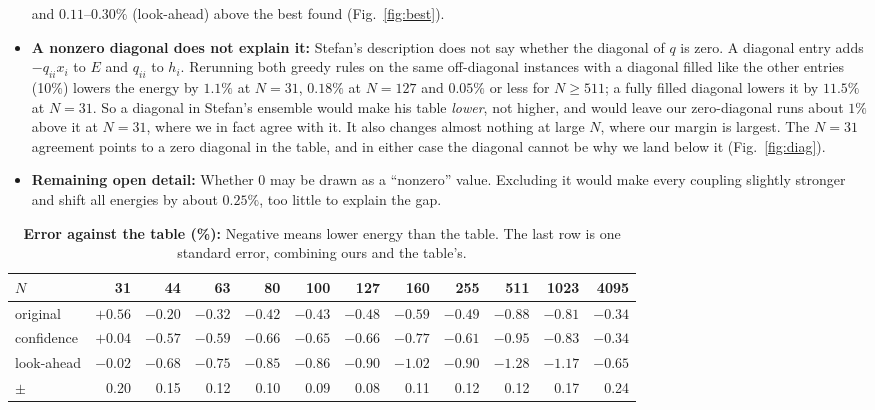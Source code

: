 \documentclass[11pt]{article}
\begin{document}
\begin{itemize}[nosep]
  and $0.11$--$0.30\%$ (look-ahead) above the best found (Fig.~\ref{fig:best}).
  \item \textbf{A nonzero diagonal does not explain it:} Stefan's description does not say whether the diagonal of $q$
  is zero. A diagonal entry adds $-q_{ii}x_i$ to $E$ and $q_{ii}$ to $h_i$. Rerunning both greedy rules on the same
  off-diagonal instances with a diagonal filled like the other entries (10\%) lowers the energy by $1.1\%$ at $N=31$,
  $0.18\%$ at $N=127$ and $0.05\%$ or less for $N \ge 511$; a fully filled diagonal lowers it by $11.5\%$ at $N=31$.
  So a diagonal in Stefan's ensemble would make his table \emph{lower}, not higher, and would leave our zero-diagonal
  runs about $1\%$ above it at $N=31$, where we in fact agree with it. It also changes almost nothing at large $N$,
  where our margin is largest. The $N=31$ agreement points to a zero diagonal in the table, and in either case the
  diagonal cannot be why we land below it (Fig.~\ref{fig:diag}).
  \item \textbf{Remaining open detail:} Whether $0$ may be drawn as a ``nonzero'' value. Excluding it would make
  every coupling slightly stronger and shift all energies by about $0.25\%$, too little to explain the gap.
\end{itemize}

\begin{table}[H]
  \centering\small\setlength{\tabcolsep}{4pt}
  \begin{tabular}{lrrrrrrrrrrr}
    \toprule
    $N$ & 31 & 44 & 63 & 80 & 100 & 127 & 160 & 255 & 511 & 1023 & 4095 \\
    \midrule
    original     & $+0.56$ & $-0.20$ & $-0.32$ & $-0.42$ & $-0.43$ & $-0.48$ & $-0.59$ & $-0.49$ & $-0.88$ & $-0.81$ & $-0.34$ \\
    confidence   & $+0.04$ & $-0.57$ & $-0.59$ & $-0.66$ & $-0.65$ & $-0.66$ & $-0.77$ & $-0.61$ & $-0.95$ & $-0.83$ & $-0.34$ \\
    look-ahead   & $-0.02$ & $-0.68$ & $-0.75$ & $-0.85$ & $-0.86$ & $-0.90$ & $-1.02$ & $-0.90$ & $-1.28$ & $-1.17$ & $-0.65$ \\
    $\pm$        & 0.20 & 0.15 & 0.12 & 0.10 & 0.09 & 0.08 & 0.11 & 0.12 & 0.12 & 0.17 & 0.24 \\
    \bottomrule
  \end{tabular}
  \caption{\textbf{Error against the table (\%):} Negative means lower energy than the table. The last row is one
  standard error, combining ours and the table's.}
  \label{tab:err}
\end{table}
\end{document}
